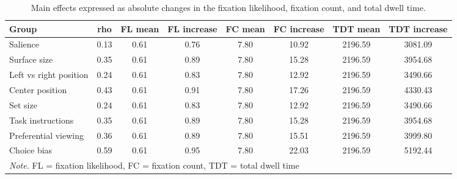 \begin{table}[ht]
\centering
\caption{Main effects expressed as absolute changes in the fixation likelihood, fixation count, and total dwell time.} 
\label{tab:em_results}
\begingroup\small
\begin{tabular}{lccccccc}
  \hline
Group & rho & FL mean & FL increase & FC mean & FC increase & TDT mean & TDT increase \\ 
  \hline
Salience & 0.13 & 0.61 & 0.76 & 7.80 & 10.92 & 2196.59 & 3081.09 \\ 
  Surface size & 0.35 & 0.61 & 0.89 & 7.80 & 15.28 & 2196.59 & 3954.68 \\ 
  Left vs right position & 0.24 & 0.61 & 0.83 & 7.80 & 12.92 & 2196.59 & 3490.66 \\ 
  Center position & 0.43 & 0.61 & 0.91 & 7.80 & 17.26 & 2196.59 & 4330.43 \\ 
  Set size & 0.24 & 0.61 & 0.83 & 7.80 & 12.92 & 2196.59 & 3490.66 \\ 
  Task instructions & 0.35 & 0.61 & 0.89 & 7.80 & 15.28 & 2196.59 & 3954.68 \\ 
  Preferential viewing & 0.36 & 0.61 & 0.89 & 7.80 & 15.51 & 2196.59 & 3999.80 \\ 
  Choice bias & 0.59 & 0.61 & 0.95 & 7.80 & 22.03 & 2196.59 & 5192.44 \\ 
   \hline 
 \multicolumn{10}{p{0.95\textwidth}}{\scriptsize{\textit{Note.} FL = fixation likelihood, FC = fixation count, TDT = total dwell time}} 
\end{tabular}
\endgroup
\end{table}
